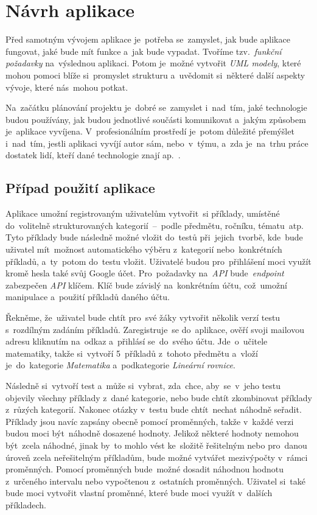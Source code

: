\documentclass[11pt,a4paper]{report}
\let\oldacrshort\acrshort
\renewcommand{\acrshort}[1]{\emph{\normalsize\color[rgb]{0,0,0}\noindent\oldacrshort{#1}}}
\begin{document}
	\chapter{Návrh aplikace}
        Před samotným vývojem aplikace je~potřeba se~zamyslet, jak bude aplikace fungovat, jaké bude mít funkce a~jak bude vypadat. Tvoříme tzv.~\emph{funkční požadavky} na~výslednou aplikaci. Potom je~možné vytvořit \emph{UML modely}, které mohou pomoci blíže si~promyslet strukturu a~uvědomit si~některé další aspekty vývoje, které nás~mohou potkat.

        Na~začátku plánování projektu je~dobré se~zamyslet i~nad~tím, jaké technologie budou používány, jak budou jednotlivé součásti komunikovat a~jakým způsobem je~aplikace vyvíjena. V~profesionálním prostředí je~potom důležité přemýšlet i~nad~tím, jestli aplikaci vyvíjí autor sám, nebo~v~týmu, a~zda je~na~trhu práce dostatek lidí, kteří dané technologie znají ap.~\cite{bctynovsky:specifikacepozadavku}.

        \section{Případ použití aplikace}
            Aplikace umožní registrovaným uživatelům vytvořit~si příklady, umístěné do~volitelně strukturovaných kategorií~--~podle předmětu, ročníku, tématu~atp. Tyto příklady bude následně možné vložit do~testů při~jejich~tvorbě, kde~bude uživatel mít~možnost automatického výběru z~kategorií nebo~konkrétních příkladů, a~ty~potom do~testu vložit. Uživatelé budou pro~přihlášení moci využít kromě hesla také svůj Google účet. Pro~požadavky na~\acrshort{API} bude~\emph{endpoint} zabezpečen \acrshort{API} klíčem. Klíč bude závislý na~konkrétním účtu, což~umožní manipulace a~použití příkladů daného účtu.
            
            Řekněme, že~uživatel bude chtít pro~své žáky vytvořit několik verzí testu s~rozdílným zadáním příkladů. Zaregistruje~se do~aplikace, ověří svoji mailovou adresu kliknutím na~odkaz a~přihlásí se~do~svého účtu. Jde~o~učitele matematiky, takže si~vytvoří 5~příkladů z~tohoto předmětu a~vloží je~do~kategorie \emph{Matematika} a~podkategorie \emph{Lineární rovnice}.

            Následně si~vytvoří test a~může si~vybrat, zda~chce, aby~se~v~jeho testu objevily všechny příklady z~dané kategorie, nebo bude chtít zkombinovat příklady z~růzých kategorií. Nakonec otázky v~testu bude chtít~nechat náhodně seřadit. Příklady jsou navíc zapsány obecně pomocí proměnných, takže v~každé verzi budou moci být~náhodně dosazené hodnoty. Jelikož některé hodnoty nemohou být~zcela náhodné, jinak by~to mohlo vést ke~složitě řešitelným nebo pro~danou úroveň zcela neřešitelným příkladům, bude možné vytvářet mezivýpočty v~rámci proměnných. Pomocí proměnných bude~možné dosadit náhodnou hodnotu z~určeného intervalu nebo vypočtenou z~ostatních proměnných. Uživatel si~také bude moci vytvořit vlastní proměnné, které bude moci využít v~dalších příkladech. 
\end{document}
